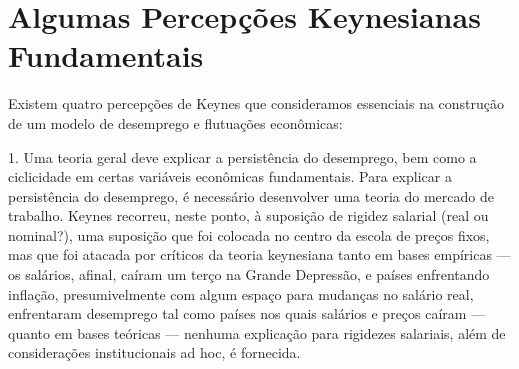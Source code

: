 \documentclass[12pt]{article}
\begin{document}
\section*{Algumas Percepções Keynesianas Fundamentais}

Existem quatro percepções de Keynes que consideramos essenciais na construção de um modelo de desemprego e flutuações econômicas:

1. Uma teoria geral deve explicar a persistência do desemprego, bem como a ciclicidade em certas variáveis econômicas fundamentais. Para explicar a persistência do desemprego, é necessário desenvolver uma teoria do mercado de trabalho. Keynes recorreu, neste ponto, à suposição de rigidez salarial (real ou nominal?), uma suposição que foi colocada no centro da escola de preços fixos, mas que foi atacada por críticos da teoria keynesiana tanto em bases empíricas — os salários, afinal, caíram um terço na Grande Depressão, e países enfrentando inflação, presumivelmente com algum espaço para mudanças no salário real, enfrentaram desemprego tal como países nos quais salários e preços caíram — quanto em bases teóricas — nenhuma explicação para rigidezes salariais, além de considerações institucionais ad hoc, é fornecida.
\end{document}
